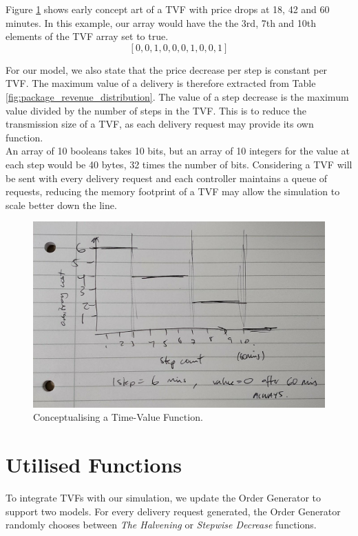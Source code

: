 \documentclass[a4paper,11pt,titlepage]{report}
\begin{document}
Figure \ref{fig:testpostplsignore} shows early concept art of a TVF with price drops at 18, 42 and 60 minutes. In this example, our array would have the the 3rd, 7th and 10th elements of the TVF array set to true.
$$ [0, 0, 1, 0, 0, 0, 1, 0, 0, 1] $$

For our model, we also state that the price decrease per step is constant per TVF. The maximum value of a delivery is therefore extracted from Table \ref{fig:package_revenue_distribution}. The value of a step decrease is the maximum value divided by the number of steps in the TVF. This is to reduce the transmission size of a TVF, as each delivery request may provide its own function.\\

An array of 10 booleans takes 10 bits, but an array of 10 integers for the value at each step would be 40 bytes, 32 times the number of bits. Considering a TVF will be sent with every delivery request and each controller maintains a queue of requests, reducing the memory footprint of a TVF may allow the simulation to scale better down the line.

\begin{figure}[!hbpt]
  \center
  \includegraphics[width=\linewidth]{img/testpostplsignore.jpg}
  \caption{Conceptualising a Time-Value Function.}
  \label{fig:testpostplsignore}
\end{figure}

\section{Utilised Functions}
To integrate TVFs with our simulation, we update the Order Generator to support two models. For every delivery request generated, the Order Generator randomly chooses between \textit{The Halvening} or \textit{Stepwise Decrease} functions.
\end{document}
